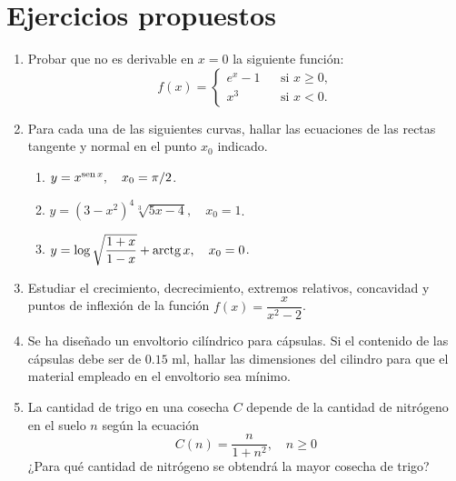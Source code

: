 \section{Ejercicios propuestos}
\begin{enumerate}[leftmargin=*]
\item  Probar que no es derivable en $x=0$ la siguiente función:
      \[ f(x)=\left\{
      \begin{array}{ccl}
      e^x-1 &  & \mbox{si } x\geq 0, \\
      x^3   &  & \mbox{si } x<0.
      \end{array}\right.
      \]

\item  Para cada una de las siguientes curvas, hallar las ecuaciones de las rectas tangente y normal en el punto $x_{0}$ indicado.
      \begin{enumerate}
      \item  $y=x^{\operatorname{sen} x},\quad x_{0}=\pi/2$.
      \item  $y=(3-x^2)^4\sqrt[3]{5x-4},\quad x_{0}=1$.
      \item  $y=\log \sqrt{\dfrac{1+x}{1-x}}+\operatorname{arctg} x, \quad x_{0}=0$.
      \end{enumerate}

\item Estudiar el crecimiento, decrecimiento, extremos relativos, concavidad y puntos de inflexión de la función $f(x)=\dfrac{x}{x^2-2}$.

\item Se ha diseñado un envoltorio cilíndrico para cápsulas.
      Si el contenido de las cápsulas debe ser de $0.15$ ml, hallar las dimensiones del cilindro para que el material empleado en el envoltorio
      sea mínimo.

\item La cantidad de trigo en una cosecha $C$ depende de la cantidad de nitrógeno en el suelo $n$ según la ecuación
      \[
      C(n) = \frac{n}{1+n^2}, \quad n\geq0
      \]
      ¿Para qué cantidad de nitrógeno se obtendrá la mayor cosecha de trigo?
\end{enumerate}
